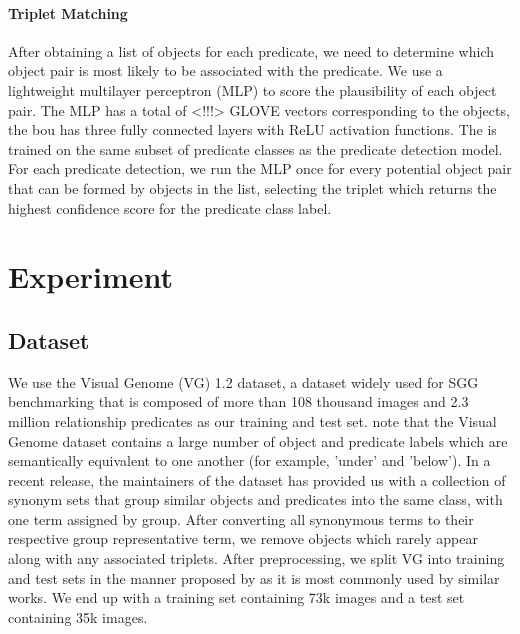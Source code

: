 \documentclass{article}
\begin{document}
\paragraph{Triplet Matching}
After obtaining a list of objects for each predicate, we need to determine which object pair is most likely to be associated with the predicate. We use a lightweight multilayer perceptron (MLP) to score the plausibility of each object pair. The MLP has a total of <!!!> GLOVE vectors corresponding to the objects, the bou  has three fully connected layers with ReLU activation functions. The is trained on the same subset of predicate classes as the predicate detection model. For each predicate detection, we run the MLP once for every potential object pair that can be formed by objects in the list, selecting the triplet which returns the highest confidence score for the predicate class label.

\section{Experiment}
\subsection{Dataset}
We use the Visual Genome (VG) 1.2 dataset, a dataset widely used for SGG benchmarking that is composed of more than 108 thousand images and 2.3 million relationship predicates \cite{krishna2017visual} as our training and test set.
note that the Visual Genome dataset contains a large number of object and predicate labels which are semantically equivalent to one another (for example, 'under' and 'below'). In a recent release, the maintainers of the dataset has provided us with a collection of synonym sets that group similar objects and predicates into the same class, with one term assigned by group. After converting all synonymous terms to their respective group representative term, we remove objects which rarely appear along with any associated triplets. 
After preprocessing, we split VG into training and test sets in the manner proposed by \cite{xu2017scene} as it is most commonly used by similar works\cite{cong2023reltr,yang2018graph}. We end up with a training set containing 73k images and a test set containing 35k images. 
\end{document}
